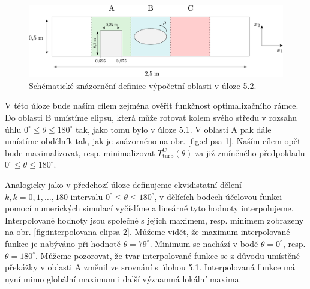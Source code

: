 \begin{figure}[H]
	\centering
	\vspace{8mm}
	\includegraphics[width=1.0	\textwidth]{Images/elipsa2.pdf}
	\vspace{2mm}
	\caption{Schématické znázornění definice výpočetní oblasti v úloze 5.2.}
	\label{fig:elipsa 2}
	\vspace{1.8mm}
\end{figure}

V této úloze bude naším cílem zejména ověřit funkčnost optimalizačního rámce. Do oblasti B umístíme elipsu, která může rotovat kolem svého středu v rozsahu úhlu $0^\circ \leq \theta \leq 180^\circ$ tak, jako tomu bylo v úloze 5.1. V oblasti A pak dále umístíme obdélník tak, jak je znázorněno na obr. \ref{fig:elipsa 1}. Naším cílem opět bude maximalizovat, resp. minimalizovat $ T^{\text{C}}_{\text{turb}} (\theta) $ za již zmíněného předpokladu $0^\circ \leq \theta \leq 180^\circ$.

Analogicky jako v předchozí úloze definujeme ekvidistatní dělení $ k, k=0,1,\dots,180$ intervalu $0^\circ \leq \theta \leq 180^\circ$, v dělících bodech účelovou funkci pomocí numerických simulací vyčíslíme a lineárně tyto hodnoty interpolujeme. Interpolované hodnoty jsou společně s jejich maximem, resp. minimem zobrazeny na obr. \ref{fig:interpolovana elipsa 2}. Můžeme vidět, že maximum interpolované funkce je nabýváno při hodnotě $ \theta = 79^\circ $. Minimum se nachází v bodě $ \theta = 0^\circ $, resp. $ \theta = 180^\circ $. Můžeme pozorovat, že tvar interpolované funkce se z důvodu umístěné překážky v oblasti A změnil ve srovnání s úlohou 5.1. Interpolovaná funkce má nyní mimo globální maximum i další významná lokální maxima.

